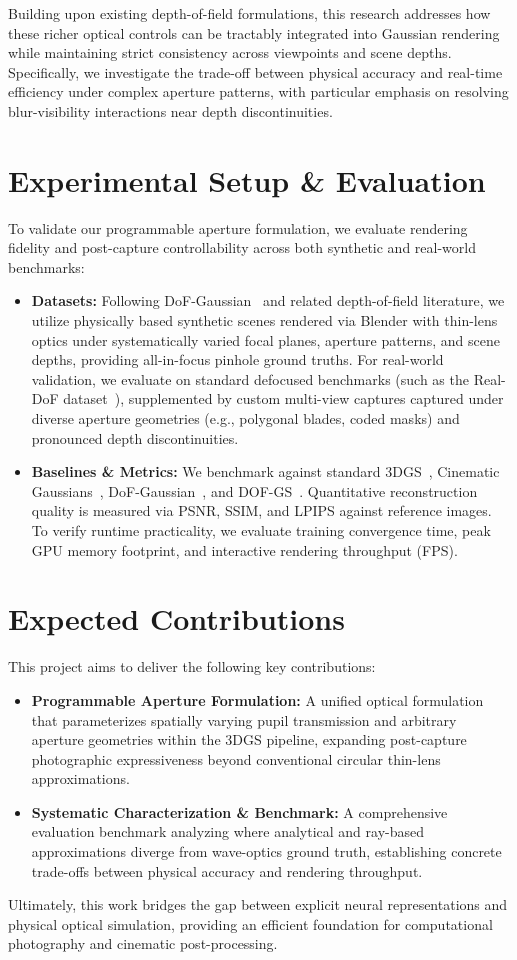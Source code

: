 \documentclass{article}
\begin{document}
Building upon existing depth-of-field formulations, this research addresses how these richer optical controls can be tractably integrated into Gaussian rendering while maintaining strict consistency across viewpoints and scene depths. Specifically, we investigate the trade-off between physical accuracy and real-time efficiency under complex aperture patterns, with particular emphasis on resolving blur-visibility interactions near depth discontinuities.
\section{Experimental Setup \& Evaluation}
To validate our programmable aperture formulation, we evaluate rendering fidelity and post-capture controllability across both synthetic and real-world benchmarks:

\begin{itemize}
    \item \textbf{Datasets:} Following DoF-Gaussian~\cite{dofgaussian} and related depth-of-field literature, we utilize physically based synthetic scenes rendered via Blender with thin-lens optics under systematically varied focal planes, aperture patterns, and scene depths, providing all-in-focus pinhole ground truths. For real-world validation, we evaluate on standard defocused benchmarks (such as the Real-DoF dataset~\cite{realdof}), supplemented by custom multi-view captures captured under diverse aperture geometries (e.g., polygonal blades, coded masks) and pronounced depth discontinuities.
    \item \textbf{Baselines \& Metrics:} We benchmark against standard 3DGS~\cite{3dgs}, Cinematic Gaussians~\cite{cinematicgaussians}, DoF-Gaussian~\cite{dofgaussian}, and DOF-GS~\cite{dofgs}. Quantitative reconstruction quality is measured via PSNR, SSIM, and LPIPS against reference images. To verify runtime practicality, we evaluate training convergence time, peak GPU memory footprint, and interactive rendering throughput (FPS).
\end{itemize}
\section{Expected Contributions}
This project aims to deliver the following key contributions:
\begin{itemize}
    \item \textbf{Programmable Aperture Formulation:} A unified optical formulation that parameterizes spatially varying pupil transmission and arbitrary aperture geometries within the 3DGS pipeline, expanding post-capture photographic expressiveness beyond conventional circular thin-lens approximations.
    \item \textbf{Systematic Characterization \& Benchmark:} A comprehensive evaluation benchmark analyzing where analytical and ray-based approximations diverge from wave-optics ground truth, establishing concrete trade-offs between physical accuracy and rendering throughput.
\end{itemize}
Ultimately, this work bridges the gap between explicit neural representations and physical optical simulation, providing an efficient foundation for computational photography and cinematic post-processing.

\end{document}
